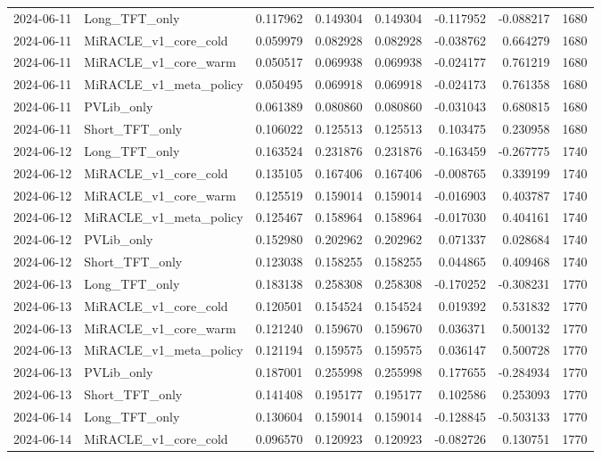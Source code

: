 \begin{tabular}{llrrrrrr}
2024-06-11 & Long_TFT_only & 0.117962 & 0.149304 & 0.149304 & -0.117952 & -0.088217 & 1680 \\
2024-06-11 & MiRACLE_v1_core_cold & 0.059979 & 0.082928 & 0.082928 & -0.038762 & 0.664279 & 1680 \\
2024-06-11 & MiRACLE_v1_core_warm & 0.050517 & 0.069938 & 0.069938 & -0.024177 & 0.761219 & 1680 \\
2024-06-11 & MiRACLE_v1_meta_policy & 0.050495 & 0.069918 & 0.069918 & -0.024173 & 0.761358 & 1680 \\
2024-06-11 & PVLib_only & 0.061389 & 0.080860 & 0.080860 & -0.031043 & 0.680815 & 1680 \\
2024-06-11 & Short_TFT_only & 0.106022 & 0.125513 & 0.125513 & 0.103475 & 0.230958 & 1680 \\
2024-06-12 & Long_TFT_only & 0.163524 & 0.231876 & 0.231876 & -0.163459 & -0.267775 & 1740 \\
2024-06-12 & MiRACLE_v1_core_cold & 0.135105 & 0.167406 & 0.167406 & -0.008765 & 0.339199 & 1740 \\
2024-06-12 & MiRACLE_v1_core_warm & 0.125519 & 0.159014 & 0.159014 & -0.016903 & 0.403787 & 1740 \\
2024-06-12 & MiRACLE_v1_meta_policy & 0.125467 & 0.158964 & 0.158964 & -0.017030 & 0.404161 & 1740 \\
2024-06-12 & PVLib_only & 0.152980 & 0.202962 & 0.202962 & 0.071337 & 0.028684 & 1740 \\
2024-06-12 & Short_TFT_only & 0.123038 & 0.158255 & 0.158255 & 0.044865 & 0.409468 & 1740 \\
2024-06-13 & Long_TFT_only & 0.183138 & 0.258308 & 0.258308 & -0.170252 & -0.308231 & 1770 \\
2024-06-13 & MiRACLE_v1_core_cold & 0.120501 & 0.154524 & 0.154524 & 0.019392 & 0.531832 & 1770 \\
2024-06-13 & MiRACLE_v1_core_warm & 0.121240 & 0.159670 & 0.159670 & 0.036371 & 0.500132 & 1770 \\
2024-06-13 & MiRACLE_v1_meta_policy & 0.121194 & 0.159575 & 0.159575 & 0.036147 & 0.500728 & 1770 \\
2024-06-13 & PVLib_only & 0.187001 & 0.255998 & 0.255998 & 0.177655 & -0.284934 & 1770 \\
2024-06-13 & Short_TFT_only & 0.141408 & 0.195177 & 0.195177 & 0.102586 & 0.253093 & 1770 \\
2024-06-14 & Long_TFT_only & 0.130604 & 0.159014 & 0.159014 & -0.128845 & -0.503133 & 1770 \\
2024-06-14 & MiRACLE_v1_core_cold & 0.096570 & 0.120923 & 0.120923 & -0.082726 & 0.130751 & 1770 \\

\end{tabular}
